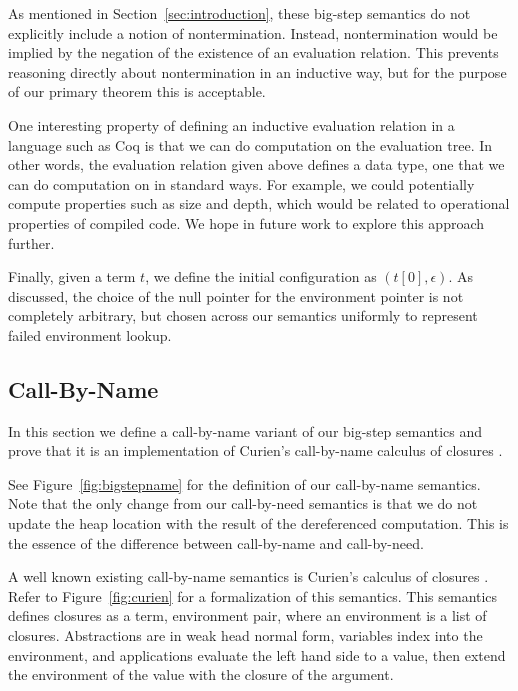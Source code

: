As mentioned in Section~\ref{sec:introduction}, these big-step semantics do not
explicitly include a notion of nontermination. Instead, nontermination would be
implied by the negation of the existence of an evaluation relation. This
prevents reasoning directly about nontermination in an inductive way, but for
the purpose of our primary theorem this is acceptable. 

One interesting property of defining an inductive evaluation relation in a
language such as Coq is that we can do computation on the evaluation tree. In other
words, the evaluation relation given above defines a data type, one that we can
do computation on in standard ways. For example, we could potentially compute
properties such as size and depth, which would be related to operational properties
of compiled code. We hope in future work to explore this approach further.

Finally, given a term $t$, we define the initial configuration as
$\left(t\left[0\right], \epsilon\right)$. As discussed, the choice of the null
pointer for the environment pointer is not completely arbitrary, but chosen
across our semantics uniformly to represent failed environment lookup. 

\subsection{Call-By-Name}

In this section we define a call-by-name variant of our big-step semantics and
prove that it is an implementation of Curien's call-by-name calculus of
closures \cite{curien1991abstract}. 

See Figure~\ref{fig:bigstepname} for the definition of our call-by-name
semantics. Note that the only change from our call-by-need semantics is that we
do not update the heap location with the result of the dereferenced computation.
This is the essence of the difference between call-by-name and call-by-need.

A well known existing call-by-name semantics is Curien's calculus of closures
\cite{curien1991abstract}. Refer to Figure~\ref{fig:curien} for a formalization of this
semantics. This semantics defines closures as a term, environment pair, where an
environment is a list of closures. Abstractions are in weak head normal form,
variables index into the environment, and applications evaluate the left hand
side to a value, then extend the environment of the value with the closure of
the argument. 


